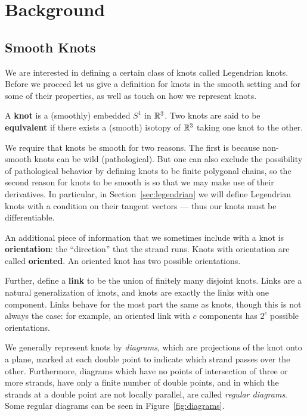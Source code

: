 \chapter{Background}\label{ch:background}
\section{Smooth Knots}\label{sec:knots}

We are interested in defining a certain class of knots called Legendrian knots. Before we proceed let us give a definition for knots in the smooth setting and for some of their properties, as well as touch on how we represent knots. 

\begin{definition}\label{defn:knots}
    A \textbf{knot} is a (smoothly) embedded $S^1$ in $\mathbb{R}^3$. Two knots are said to be \textbf{equivalent} if there exists a (smooth) isotopy of $\mathbb{R}^3$ taking one knot to the other.
\end{definition}
We require that knots be smooth for two reasons. The first is because non-smooth knots can be wild (pathological). But one can also exclude the possibility of pathological behavior by defining knots to be finite polygonal chains, so the second reason for knots to be smooth is so that we may make use of their derivatives. In particular, in Section~\ref{sec:legendrian} we will define Legendrian knots with a condition on their tangent vectors --- thus our knots must be differentiable.

An additional piece of information that we sometimes include with a knot is \textbf{orientation}: the ``direction'' that the strand runs. Knots with orientation are called \textbf{oriented}. An oriented knot has two possible orientations.

Further, define a \textbf{link} to be the union of finitely many disjoint knots. Links are a natural generalization of knots, and knots are exactly the links with one component.
Links behave for the most part the same as knots, though this is not always the case: for example, an oriented link with $c$ components has $2^c$ possible orientations.


We generally represent knots by \emph{diagrams}, which are projections of the knot onto a plane, marked at each double point to indicate which strand passes over the other.
Furthermore, diagrams which have no points of intersection of three or more strands, have only a finite number of double points, and in which the strands at a double point are not locally parallel, are called \emph{regular diagrams}. Some regular diagrams can be seen in Figure~\ref{fig:diagrams}.

